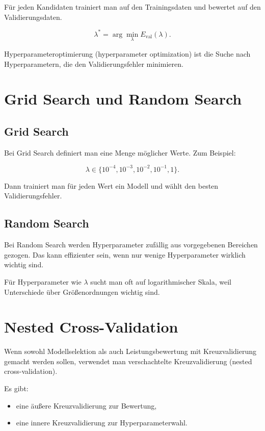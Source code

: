 Für jeden Kandidaten trainiert man auf den Trainingsdaten und bewertet auf den Validierungsdaten.

\[
    \lambda^*
    =
    \arg\min_{\lambda}
    E_{\mathrm{val}}(\lambda).
\]

\begin{definitionbox}
Hyperparameteroptimierung (hyperparameter optimization) ist die Suche nach Hyperparametern, die den Validierungsfehler minimieren.
\end{definitionbox}

\section{Grid Search und Random Search}

\subsection{Grid Search}

Bei Grid Search definiert man eine Menge möglicher Werte.
Zum Beispiel:

\[
    \lambda \in \{10^{-4},10^{-3},10^{-2},10^{-1},1\}.
\]

Dann trainiert man für jeden Wert ein Modell und wählt den besten Validierungsfehler.

\subsection{Random Search}

Bei Random Search werden Hyperparameter zufällig aus vorgegebenen Bereichen gezogen.
Das kann effizienter sein, wenn nur wenige Hyperparameter wirklich wichtig sind.

\begin{notebox}
Für Hyperparameter wie \(\lambda\) sucht man oft auf logarithmischer Skala, weil Unterschiede über Größenordnungen wichtig sind.
\end{notebox}

\section{Nested Cross-Validation}

Wenn sowohl Modellselektion als auch Leistungsbewertung mit Kreuzvalidierung gemacht werden sollen, verwendet man verschachtelte Kreuzvalidierung (nested cross-validation).

Es gibt:

\begin{itemize}
    \item eine äußere Kreuzvalidierung zur Bewertung,
    \item eine innere Kreuzvalidierung zur Hyperparameterwahl.
\end{itemize}

